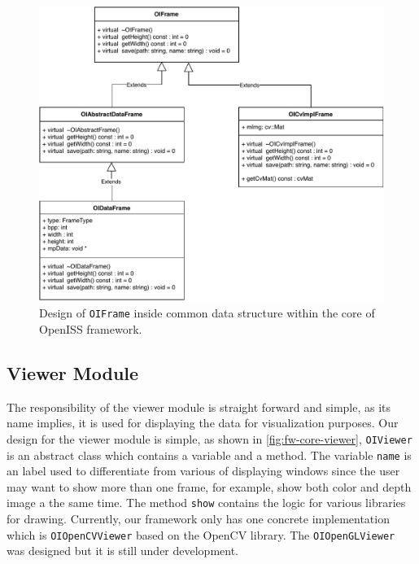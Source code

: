 \begin{figure}
    \centering
    \includegraphics[width=\linewidth]{figures/framework_core_oiframe.pdf}
    \caption{
        Design of \texttt{OIFrame} inside common data structure within the core
        of OpenISS framework.
    }
    \label{fig:fw-core-oiframe}
\end{figure}

\subsection{Viewer Module}
\label{sec:fw-design-core-viewer}

The responsibility of the viewer module is straight forward and simple, as its name
implies, it is used for displaying the data for visualization purposes. Our
design for the viewer module is simple, as shown in
\autoref{fig:fw-core-viewer}, \texttt{OIViewer} is an abstract class which
contains a variable and a method. The variable \texttt{name} is an label used
to differentiate from various of displaying windows since the user may want to
show more than one frame, for example, show both color and depth image a the
same time.
The method \texttt{show} contains the logic for various libraries for
drawing. Currently, our framework only has one concrete implementation which
is \texttt{OIOpenCVViewer} based on the OpenCV library.
The \texttt{OIOpenGLViewer} was designed but it is still under
development.

